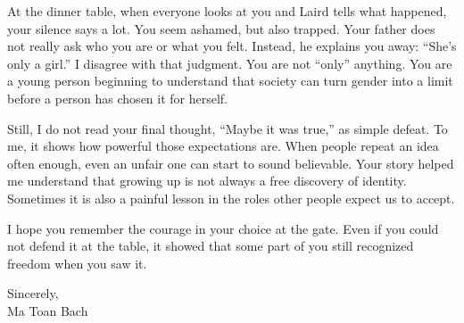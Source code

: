 \documentclass[12pt]{article}
\begin{document}
At the dinner table, when everyone looks at you and Laird tells what happened, your silence says a lot. You seem ashamed, but also trapped. Your father does not really ask who you are or what you felt. Instead, he explains you away: ``She's only a girl.'' I disagree with that judgment. You are not ``only'' anything. You are a young person beginning to understand that society can turn gender into a limit before a person has chosen it for herself.

Still, I do not read your final thought, ``Maybe it was true,'' as simple defeat. To me, it shows how powerful those expectations are. When people repeat an idea often enough, even an unfair one can start to sound believable. Your story helped me understand that growing up is not always a free discovery of identity. Sometimes it is also a painful lesson in the roles other people expect us to accept.

I hope you remember the courage in your choice at the gate. Even if you could not defend it at the table, it showed that some part of you still recognized freedom when you saw it.

\vspace{1em}

\noindent Sincerely,\\
Ma Toan Bach
\end{document}
